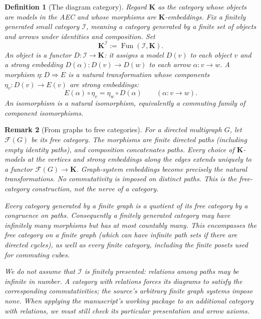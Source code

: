 \documentclass[11pt]{article}
\newcommand{\K}{\mathbf K}
\theoremstyle{plain}
\newtheorem{definition}{Definition}[section]
\newtheorem{remark}[definition]{Remark}
\begin{document}
\begin{definition}[The diagram category]
Regard $\K$ as the category whose objects are
models in the AEC and whose morphisms are
$\K$-embeddings. Fix a \emph{finitely generated small category}
$\mathcal I$, meaning a category generated by
a finite set of objects and arrows under
identities and composition. Set
\[
\K^{\mathcal I}:=\operatorname{Fun}(\mathcal I,\K).
\]
An object is a functor $D:\mathcal I\to\K$:
it assigns a model $D(v)$ to each object $v$
and a strong embedding $D(\alpha):D(v)\to D(w)$
to each arrow $\alpha:v\to w$.
A morphism $\eta:D\Rightarrow E$ is a
natural transformation whose components
$\eta_v:D(v)\to E(v)$ are strong embeddings:
\[
E(\alpha)\circ\eta_v=\eta_w\circ D(\alpha)
\qquad(\alpha:v\to w).
\]
An isomorphism is a natural isomorphism,
equivalently a commuting family of
component isomorphisms.
\end{definition}

\begin{remark}[From graphs to free categories]
\label{rem:free-shape}
For a directed multigraph $G$, let
$\mathcal F(G)$ be its \emph{free category}.
The morphisms are finite directed paths
(including empty identity paths), and
composition concatenates paths. Every
choice of $\K$-models at the vertices
and strong embeddings along the edges
extends uniquely to a functor
$\mathcal F(G)\to\K$.
Graph-system embeddings become precisely
the natural transformations.
No commutativity is imposed on distinct
paths. This is the \emph{free-category}
construction, not the nerve of a category.

Every category generated by a finite graph
is a quotient of its free category by a
congruence on paths. Consequently a
\emph{finitely generated category} may
have infinitely many morphisms but has
at most countably many. This encompasses
the free category on a finite graph
(which can have infinite path sets if
there are directed cycles), as well as
every finite category, including the
finite posets used for commuting cubes.

We do \emph{not} assume that $\mathcal I$
is finitely presented: relations among
paths may be infinite in number.
A category with relations forces its
diagrams to satisfy the corresponding
commutativities; the source's arbitrary
finite graph systems impose none.
When applying the manuscript's working
package to an additional category with
relations, we must still check its
particular presentation and arrow axioms.
\end{remark}
\end{document}
